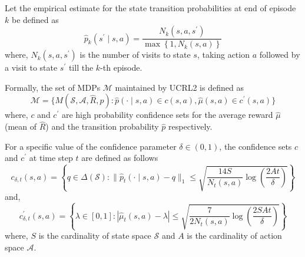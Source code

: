 Let the empirical estimate for the state transition probabilities at end of episode $k$ be defined as  
$$\hat{p}_k(s^\prime \mid s, a) = \frac{N_k(s, a, s^\prime)}{\max\left\{ 1, N_k(s,a) \right\}}$$
where, $N_k(s, a, s^\prime)$ is the number of visits to state $s$, taking action $a$ followed by a visit to state $s^\prime$ till the $k$-th episode.

Formally, the set of MDPs $\mathcal{M}$ maintained by UCRL2 is defined as
$$\mathcal{M} = \{ M(\mathcal{S}, \mathcal{A}, \hat{R}, \hat{p}) : \hat{p}(\cdot \mid s, a) \in c(s, a), \hat{\mu}(s, a) \in c^\prime(s, a)\}$$
where, $c$ and $c^\prime$ are high probability confidence sets for the average reward $\hat{\mu}$ (mean of $\hat{R}$) and the transition probability $\hat{p}$ respectively.

For a specific value of the confidence parameter $\delta \in (0,1)$, the confidence sets $c$ and $c^\prime$ at time step $t$ are defined as follows
\begin{equation}
c_{\delta, t} (s,a) = \left\{ q \in \Delta(\mathcal{S}): \| \hat{p}_t (\cdot \mid s, a) - q \|_1 \le \sqrt{ \frac{14S}{N_t(s,a)}\log\left( \frac{2At}{\delta} \right)}\right\}
\label{eq:ci_p}
\end{equation}
and,
\begin{equation}
c^\prime_{\delta, t} (s,a) = \left\{ \lambda \in [0,1]: | \hat{\mu}_t (s, a) - \lambda | \le \sqrt{ \frac{7}{2N_t(s,a)}\log\left( \frac{2SAt}{\delta} \right)}\right\}
\label{eq:ci_r}
\end{equation}
where, $S$ is the cardinality of state space $\mathcal{S}$ and $A$ is the cardinality of action space $\mathcal{A}$.

